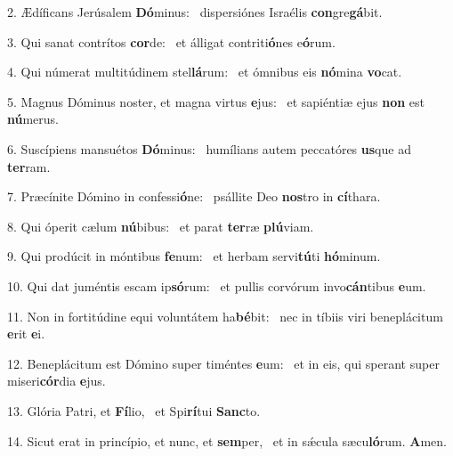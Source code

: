 2. Ædíficans Jerúsalem \textbf{Dó}minus: \ast\  dispersiónes Israélis \textbf{con}gre\textbf{gá}bit.\

3. Qui sanat contrítos \textbf{cor}de: \ast\  et álligat contriti\textbf{ó}nes e\textbf{ó}rum.\

4. Qui númerat multitúdinem stel\textbf{lá}rum: \ast\  et ómnibus eis \textbf{nó}mina \textbf{vo}cat.\

5. Magnus Dóminus noster, et magna virtus \textbf{e}jus: \ast\  et sapiéntiæ ejus \textbf{non} est \textbf{nú}merus.\

6. Suscípiens mansuétos \textbf{Dó}minus: \ast\  humílians autem peccatóres \textbf{us}que ad \textbf{ter}ram.\

7. Præcínite Dómino in confessi\textbf{ó}ne: \ast\  psállite Deo \textbf{nos}tro in \textbf{cí}thara.\

8. Qui óperit cælum \textbf{nú}bibus: \ast\  et parat \textbf{ter}ræ \textbf{plú}viam.\

9. Qui prodúcit in móntibus \textbf{fe}num: \ast\  et herbam servi\textbf{tú}ti \textbf{hó}minum.\

10. Qui dat juméntis escam ip\textbf{só}rum: \ast\  et pullis corvórum invo\textbf{cán}tibus \textbf{e}um.\

11. Non in fortitúdine equi voluntátem ha\textbf{bé}bit: \ast\  nec in tíbiis viri beneplácitum \textbf{e}rit \textbf{e}i.\

12. Beneplácitum est Dómino super timéntes \textbf{e}um: \ast\  et in eis, qui sperant super miseri\textbf{cór}dia \textbf{e}jus.\

13. Glória Patri, et \textbf{Fí}lio, \ast\  et Spi\textbf{rí}tui \textbf{Sanc}to.\

14. Sicut erat in princípio, et nunc, et \textbf{sem}per, \ast\  et in sǽcula sæcu\textbf{ló}rum. \textbf{A}men.\

